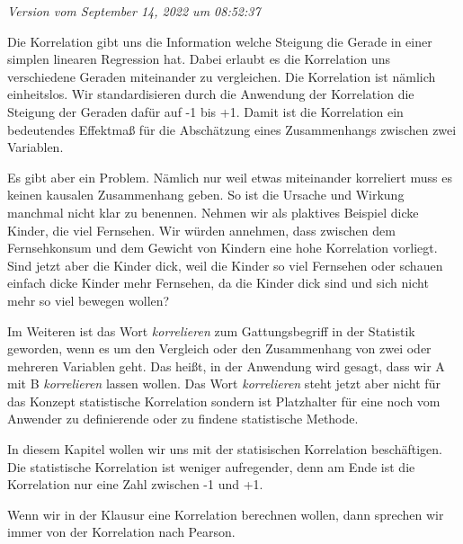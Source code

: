 \documentclass[
  letterpaper,
]{scrbook}
\begin{document}
\emph{Version vom September 14, 2022 um 08:52:37}

Die Korrelation gibt uns die Information welche Steigung die Gerade in
einer simplen linearen Regression hat. Dabei erlaubt es die Korrelation
uns verschiedene Geraden miteinander zu vergleichen. Die Korrelation ist
nämlich einheitslos. Wir standardisieren durch die Anwendung der
Korrelation die Steigung der Geraden dafür auf -1 bis +1. Damit ist die
Korrelation ein bedeutendes Effektmaß für die Abschätzung eines
Zusammenhangs zwischen zwei Variablen.

Es gibt aber ein Problem. Nämlich nur weil etwas miteinander korreliert
muss es keinen kausalen Zusammenhang geben. So ist die Ursache und
Wirkung manchmal nicht klar zu benennen. Nehmen wir als plaktives
Beispiel dicke Kinder, die viel Fernsehen. Wir würden annehmen, dass
zwischen dem Fernsehkonsum und dem Gewicht von Kindern eine hohe
Korrelation vorliegt. Sind jetzt aber die Kinder dick, weil die Kinder
so viel Fernsehen oder schauen einfach dicke Kinder mehr Fernsehen, da
die Kinder dick sind und sich nicht mehr so viel bewegen wollen?


Im Weiteren ist das Wort \emph{korrelieren} zum Gattungsbegriff in der
Statistik geworden, wenn es um den Vergleich oder den Zusammenhang von
zwei oder mehreren Variablen geht. Das heißt, in der Anwendung wird
gesagt, dass wir A mit B \emph{korrelieren} lassen wollen. Das Wort
\emph{korrelieren} steht jetzt aber nicht für das Konzept statistische
Korrelation sondern ist Platzhalter für eine noch vom Anwender zu
definierende oder zu findene statistische Methode.

In diesem Kapitel wollen wir uns mit der statisischen Korrelation
beschäftigen. Die statistische Korrelation ist weniger aufregender, denn
am Ende ist die Korrelation nur eine Zahl zwischen -1 und +1.

\begin{tcolorbox}[enhanced jigsaw, coltitle=black, titlerule=0mm, bottomrule=.15mm, opacityback=0, opacitybacktitle=0.6, leftrule=.75mm, title=\textcolor{quarto-callout-caution-color}{\faFire}\hspace{0.5em}{Ein Wort zur Klausur}, toprule=.15mm, bottomtitle=1mm, toptitle=1mm, left=2mm, breakable, arc=.35mm, colback=white, rightrule=.15mm, colbacktitle=quarto-callout-caution-color!10!white, colframe=quarto-callout-caution-color-frame]
Wenn wir in der Klausur eine Korrelation berechnen wollen, dann sprechen
wir immer von der Korrelation nach Pearson.
\end{tcolorbox}
\end{document}
